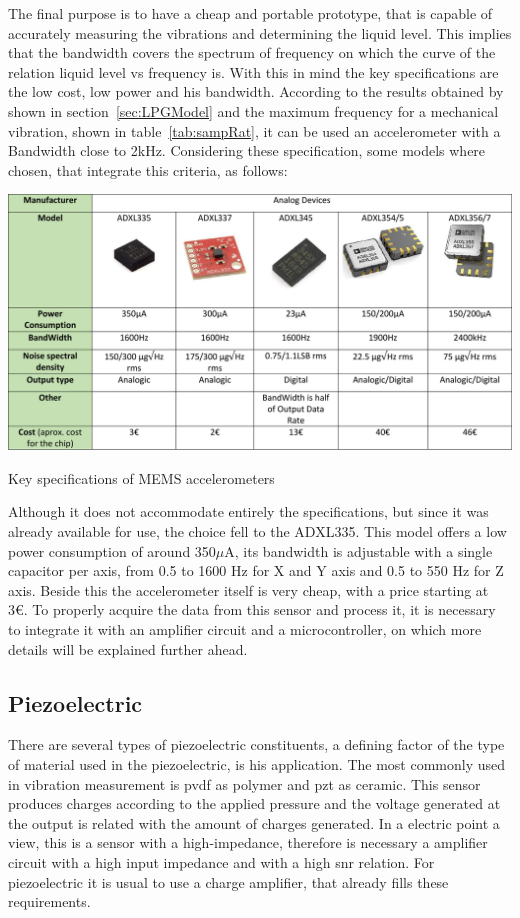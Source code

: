 The final purpose is to have a cheap and portable prototype, that is capable of accurately measuring the vibrations and determining the liquid level. This implies that the bandwidth covers the spectrum of frequency on which the curve of the relation liquid level vs frequency is. With this in mind the key specifications are the low cost, low power and his bandwidth. According to the results obtained by~\citeauthor{wuLiquidLevelDetector2014b}\cite{wuLiquidLevelDetector2014b} shown in section~\ref{sec:LPGModel} and the maximum frequency for a mechanical vibration, shown in table~\ref{tab:sampRat}, it can be used an accelerometer with a Bandwidth close to 2kHz. Considering these specification, some models where chosen, that integrate this criteria, as follows:
\begin{table}
    \centering
    \includegraphics[width=1\textwidth]{Chapters/4CHP/Figures/accTable.pdf}
    \caption{Key specifications of MEMS accelerometers}
    \label{tab:acctable}
\end{table}

Although it does not accommodate entirely the specifications, but since it was already available for use, the choice fell to the ADXL335. This model offers a low power consumption of around 350$\mu$A, its bandwidth is adjustable with a single capacitor per axis, from 0.5 to 1600 Hz for X and Y axis and 0.5 to 550 Hz for Z axis. Beside this the accelerometer itself is very cheap, with a price starting at 3€. To properly acquire the data from this sensor and process it, it is necessary to integrate it with an amplifier circuit and a microcontroller, on which more details will be explained further ahead.
\subsection{Piezoelectric}

There are several types of piezoelectric constituents, a defining factor of the type of material used in the piezoelectric, is his application. The most commonly used in vibration measurement is \acrshort{pvdf} as polymer and \acrshort{pzt} as ceramic. This sensor produces charges according to the applied pressure and the voltage generated at the output is related with the amount of charges generated. In a electric point a view, this is a sensor with a high-impedance, therefore is necessary a amplifier circuit with a high input impedance and with a high \acrshort{snr} relation. For piezoelectric it is usual to use a charge amplifier, that already fills these requirements.

